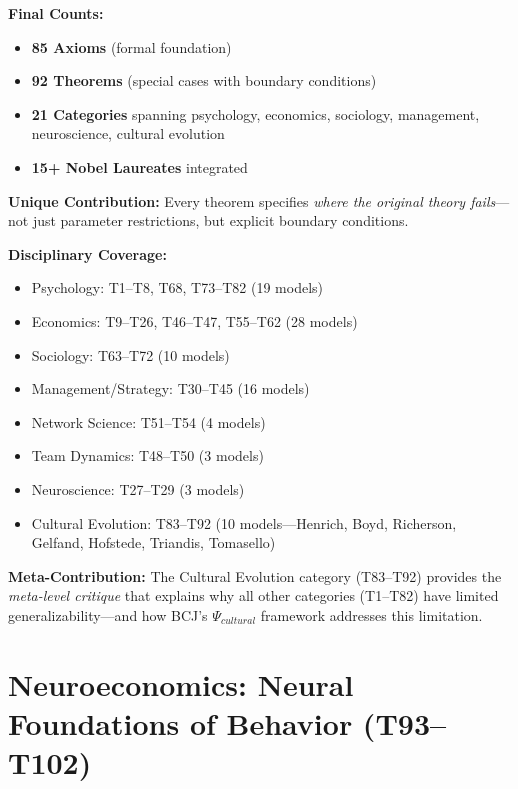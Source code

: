 \begin{tcolorbox}[colback=green!5!white, colframe=green!75!black,
    title=Complete Framework: 92 Theorems Across 21 Categories]
\textbf{Final Counts:}
\begin{itemize}[nosep]
\item \textbf{85 Axioms} (formal foundation)
\item \textbf{92 Theorems} (special cases with boundary conditions)
\item \textbf{21 Categories} spanning psychology, economics, sociology, management, neuroscience, cultural evolution
\item \textbf{15+ Nobel Laureates} integrated
\end{itemize}

\textbf{Unique Contribution:} Every theorem specifies \textit{where the original theory fails}---not just parameter restrictions, but explicit boundary conditions.

\textbf{Disciplinary Coverage:}
\begin{itemize}[nosep]
\item Psychology: T1--T8, T68, T73--T82 (19 models)
\item Economics: T9--T26, T46--T47, T55--T62 (28 models)
\item Sociology: T63--T72 (10 models)
\item Management/Strategy: T30--T45 (16 models)
\item Network Science: T51--T54 (4 models)
\item Team Dynamics: T48--T50 (3 models)
\item Neuroscience: T27--T29 (3 models)
\item Cultural Evolution: T83--T92 (10 models---Henrich, Boyd, Richerson, Gelfand, Hofstede, Triandis, Tomasello)
\end{itemize}

\textbf{Meta-Contribution:} The Cultural Evolution category (T83--T92) provides the \textit{meta-level critique} that explains why all other categories (T1--T82) have limited generalizability---and how BCJ's $\Psi_{cultural}$ framework addresses this limitation.
\end{tcolorbox}



\section{Neuroeconomics: Neural Foundations of Behavior (T93--T102)}
\label{sec:bcj-neuroeconomics}

